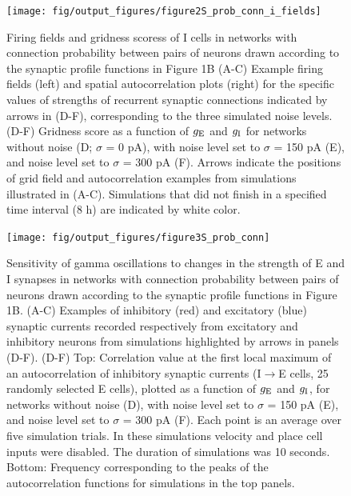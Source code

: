 \documentclass[a4paper,12pt]{article}
\newcommand{\ssc}[3]{\ensuremath{#1_{\text{#2}_{\text{#3}}}}}
\newcommand{\gE      }{\ssc{g}      {\scriptsize{E}}{}}
\newcommand{\gI      }{\ssc{g}      {\scriptsize{I}}{}}
\begin{document}
\clearpage

\begin{figure}[p]
    \internallinenumbers
    \centering
        \texttt{[image: fig/output\_figures/figure2S\_prob\_conn\_i\_fields]}
    \caption{Firing fields and gridness scoress of I cells in networks with
    connection probability between pairs of neurons drawn according to the
    synaptic profile functions in Figure 1B (A-C) Example firing fields (left)
    and spatial autocorrelation plots (right) for the specific values of
    strengths of recurrent synaptic connections indicated by arrows in (D-F),
    corresponding to the three simulated noise levels.  (D-F) Gridness score as
    a function of $\gE$ and $\gI$ for networks without noise (D; $\sigma$ = 0
    pA), with noise level set to $\sigma$ = 150 pA (E), and noise level set to
    $\sigma$ = 300 pA (F). Arrows indicate the positions of grid field and
    autocorrelation examples from simulations illustrated in (A-C). Simulations
    that did not finish in a specified time interval (8 h) are indicated by
    white color.}
\end{figure}

\clearpage

%

\setcounter{figure}{0}
\renewcommand{\figurename}{Figure 3 - figure supplement}

\begin{figure}[p]
    \internallinenumbers
    \centering
        \texttt{[image: fig/output\_figures/figure3S\_prob\_conn]}
\end{figure}

\clearpage

\begin{figure}[H]
    \internallinenumbers
    \caption{Sensitivity of gamma oscillations to changes in the strength of E
    and I synapses in networks with connection probability between pairs of
    neurons drawn according to the synaptic profile functions in Figure 1B.
    (A-C) Examples of inhibitory (red) and excitatory (blue) synaptic currents
    recorded respectively from excitatory and inhibitory neurons from
    simulations highlighted by arrows in panels (D-F).  (D-F) Top: Correlation
    value at the first local maximum of an autocorrelation of inhibitory
    synaptic currents (I$\rightarrow$E cells, 25 randomly selected E cells),
    plotted as a function of $\gE$ and $\gI$, for networks without noise (D), with
    noise level set to $\sigma$ = 150 pA (E), and noise level set to $\sigma$ =
    300 pA (F). Each point is an average over five simulation trials. In these
    simulations velocity and place cell inputs were disabled.  The duration of
    simulations was 10 seconds.  Bottom: Frequency corresponding to the peaks
    of the autocorrelation functions for simulations in the top panels.}
\end{figure}
\end{document}
